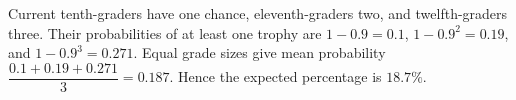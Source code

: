 Current tenth-graders have one chance, eleventh-graders two, and twelfth-graders three. Their probabilities of at least one trophy are $1-0.9=0.1$, $1-0.9^2=0.19$, and $1-0.9^3=0.271$. Equal grade sizes give mean probability $\dfrac{0.1+0.19+0.271}{3}=0.187$. Hence the expected percentage is $\boxed{18.7\%}$.
